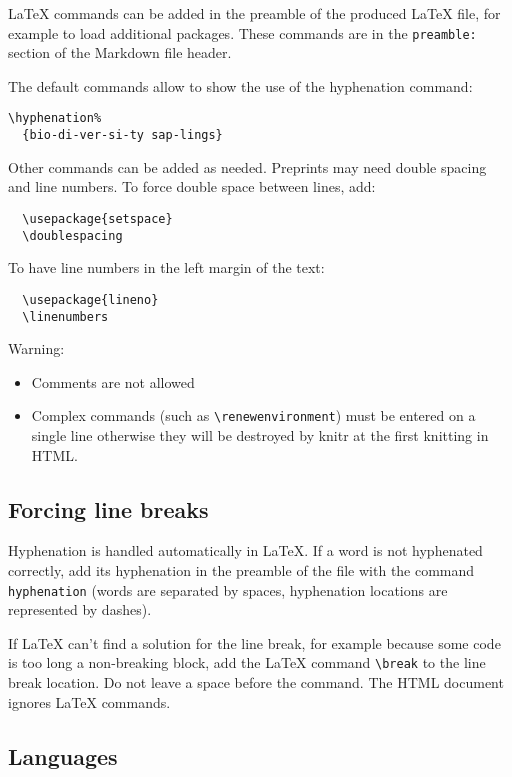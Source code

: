 \documentclass[fleqn,]{article} %
\providecommand{\tightlist}{%
  \setlength{\itemsep}{0pt}\setlength{\parskip}{0pt}}
\begin{document}
LaTeX commands can be added in the preamble of the produced LaTeX file, for example to load additional packages.
These commands are in the \texttt{preamble:} section of the Markdown file header.

The default commands allow to show the use of the hyphenation command:

\begin{verbatim}
\hyphenation%
  {bio-di-ver-si-ty sap-lings}
\end{verbatim}

Other commands can be added as needed.
Preprints may need double spacing and line numbers.
To force double space between lines, add:

\begin{verbatim}
  \usepackage{setspace}
  \doublespacing
\end{verbatim}

To have line numbers in the left margin of the text:

\begin{verbatim}
  \usepackage{lineno}
  \linenumbers
\end{verbatim}

Warning:

\begin{itemize}
\tightlist
\item
  Comments are not allowed
\item
  Complex commands (such as \texttt{\textbackslash{}renewenvironment}) must be entered on a single line otherwise they will be destroyed by knitr at the first knitting in HTML.
\end{itemize}

\subsection{Forcing line breaks}\label{forcing-line-breaks}

Hyphenation is handled automatically in LaTeX.
If a word is not hyphenated correctly, add its hyphenation in the preamble of the file with the command \texttt{hyphenation} (words are separated by spaces, hyphenation locations are represented by dashes).

If LaTeX can't find a solution for the line break, for example because some code is too long a non-breaking block, add the LaTeX command \texttt{\textbackslash{}break} to the line break location.
Do not leave a space before the command.
The HTML document ignores LaTeX commands.

\subsection{Languages}\label{languages}
\end{document}
